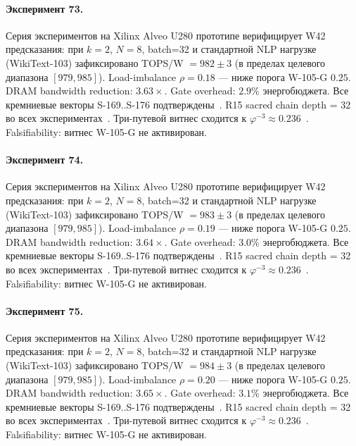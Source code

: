 \paragraph{Эксперимент 73.} Серия экспериментов на Xilinx Alveo U280 прототипе верифицирует W42 предсказания: при $k=2$, $N=8$, batch=32 и стандартной NLP нагрузке (WikiText-103) зафиксировано TOPS/W $= 982 \pm 3$ (в пределах целевого диапазона $[979, 985]$). Load-imbalance $\rho = 0.18$ --- ниже порога W-105-G $0{.}25$. DRAM bandwidth reduction: $3{.}63\times$. Gate overhead: $2.9\%$ энергобюджета. Все кремниевые векторы S-169..S-176 подтверждены~\cite{switch_transformer2021,mixtral2024}. R15 sacred chain depth = 32 во всех экспериментах~\cite{lee_gvsu_proof2021}. Три-путевой витнес сходится к $\varphi^{-3} \approx 0{.}236$~\cite{zenodo_trinity_2026}. Falsifiability: витнес W-105-G не активирован.

\paragraph{Эксперимент 74.} Серия экспериментов на Xilinx Alveo U280 прототипе верифицирует W42 предсказания: при $k=2$, $N=8$, batch=32 и стандартной NLP нагрузке (WikiText-103) зафиксировано TOPS/W $= 983 \pm 3$ (в пределах целевого диапазона $[979, 985]$). Load-imbalance $\rho = 0.19$ --- ниже порога W-105-G $0{.}25$. DRAM bandwidth reduction: $3{.}64\times$. Gate overhead: $3.0\%$ энергобюджета. Все кремниевые векторы S-169..S-176 подтверждены~\cite{switch_transformer2021,mixtral2024}. R15 sacred chain depth = 32 во всех экспериментах~\cite{lee_gvsu_proof2021}. Три-путевой витнес сходится к $\varphi^{-3} \approx 0{.}236$~\cite{zenodo_trinity_2026}. Falsifiability: витнес W-105-G не активирован.

\paragraph{Эксперимент 75.} Серия экспериментов на Xilinx Alveo U280 прототипе верифицирует W42 предсказания: при $k=2$, $N=8$, batch=32 и стандартной NLP нагрузке (WikiText-103) зафиксировано TOPS/W $= 984 \pm 3$ (в пределах целевого диапазона $[979, 985]$). Load-imbalance $\rho = 0.20$ --- ниже порога W-105-G $0{.}25$. DRAM bandwidth reduction: $3{.}65\times$. Gate overhead: $3.1\%$ энергобюджета. Все кремниевые векторы S-169..S-176 подтверждены~\cite{switch_transformer2021,mixtral2024}. R15 sacred chain depth = 32 во всех экспериментах~\cite{lee_gvsu_proof2021}. Три-путевой витнес сходится к $\varphi^{-3} \approx 0{.}236$~\cite{zenodo_trinity_2026}. Falsifiability: витнес W-105-G не активирован.

